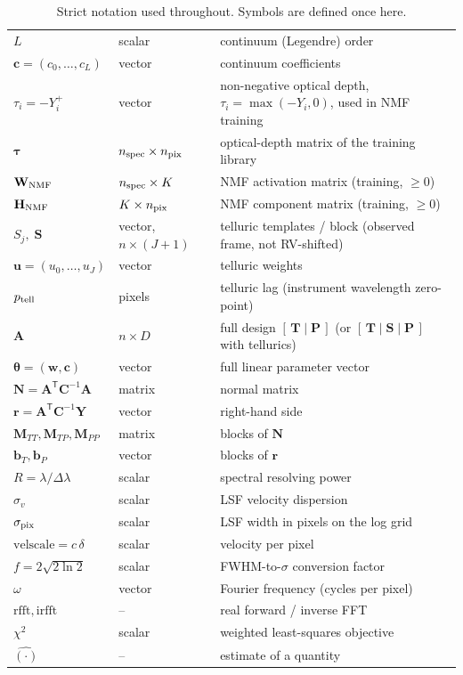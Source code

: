 \documentclass[11pt]{article}
\newcommand{\T}{\mathsf{T}}                    %
\newcommand{\rfft}{\mathrm{rfft}}
\newcommand{\irfft}{\mathrm{irfft}}
\newcommand{\velscale}{\mathrm{velscale}}
\begin{document}
\begin{table}[h]
\begin{tabular}{@{}llp{}@{}}
$L$                  & scalar    & continuum (Legendre) order \\
$\mathbf{c}=(c_0,\dots,c_L)$ & vector & continuum coefficients \\[2pt]
$\tau_i = -Y_i^+$    & vector    & non-negative optical depth, $\tau_i=\max(-Y_i,0)$, used in NMF training \\
$\boldsymbol\tau$    & $n_{\rm spec}\times n_{\rm pix}$ & optical-depth matrix of the training library \\
$\mathbf{W}_{\rm NMF}$ & $n_{\rm spec}\times K$ & NMF activation matrix (training, $\geq 0$) \\
$\mathbf{H}_{\rm NMF}$ & $K\times n_{\rm pix}$ & NMF component matrix (training, $\geq 0$) \\[2pt]
$S_j,\;\mathbf{S}$   & vector, $n\times(J{+}1)$ & telluric templates / block (observed frame, not RV-shifted) \\
$\mathbf{u}=(u_0,\dots,u_J)$ & vector & telluric weights \\
$p_{\rm tell}$       & pixels    & telluric lag (instrument wavelength zero-point) \\[2pt]
$\mathbf{A}$         & $n\times D$ & full design $[\,\mathbf{T}\mid\mathbf{P}\,]$ (or $[\,\mathbf{T}\mid\mathbf{S}\mid\mathbf{P}\,]$ with tellurics) \\
$\boldsymbol\theta=(\mathbf{w},\mathbf{c})$ & vector & full linear parameter vector \\
$\mathbf{N}=\mathbf{A}^\T\mathbf{C}^{-1}\mathbf{A}$ & matrix & normal matrix \\
$\mathbf{r}=\mathbf{A}^\T\mathbf{C}^{-1}\mathbf{Y}$ & vector & right-hand side \\
$\mathbf{M}_{TT},\mathbf{M}_{TP},\mathbf{M}_{PP}$ & matrix & blocks of $\mathbf{N}$ \\
$\mathbf{b}_T,\mathbf{b}_P$ & vector & blocks of $\mathbf{r}$ \\[2pt]
$R=\lambda/\Delta\lambda$ & scalar & spectral resolving power \\
$\sigma_v$           & scalar    & LSF velocity dispersion \\
$\sigma_{\rm pix}$   & scalar    & LSF width in pixels on the log grid \\
$\velscale=c\,\delta$ & scalar   & velocity per pixel \\
$f=2\sqrt{2\ln 2}$   & scalar    & FWHM-to-$\sigma$ conversion factor \\[2pt]
$\omega$             & vector    & Fourier frequency (cycles per pixel) \\
$\rfft,\irfft$       & --        & real forward / inverse FFT \\
$\chi^2$             & scalar    & weighted least-squares objective \\
$\widehat{(\cdot)}$  & --        & estimate of a quantity \\
\bottomrule
\end{tabular}
\caption{Strict notation used throughout. Symbols are defined once here.}
\label{tab:notation}
\end{table}
\end{document}
